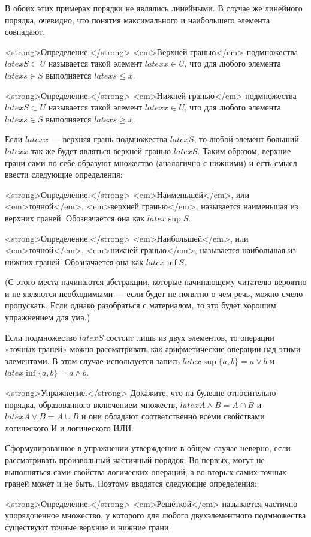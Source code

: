 В обоих этих примерах порядки не являлись линейными. В случае же линейного порядка, очевидно, что понятия максимального и наибольшего элемента совпадают.

<strong>Определение.</strong> <em>Верхней гранью</em> подмножества $latex S\subset U$ называется такой элемент $latex x\in U$, что для любого элемента $latex s\in S$ выполняется $latex s \le x$.

<strong>Определение.</strong> <em>Нижней гранью</em> подмножества $latex S\subset U$ называется такой элемент $latex x\in U$, что для любого элемента $latex s\in S$ выполняется $latex s \ge x$.

Если $latex x$ — верхняя грань подмножества $latex S$, то любой элемент больший $latex x$ так же будет являться верхней гранью $latex S$. Таким образом, верхние грани сами по себе образуют множество (аналогично с нижними) и есть смысл ввести следующие определения:

<strong>Определение.</strong> <em>Наименьшей</em>, или <em>точной</em>, <em>верхней гранью</em>, называется наименьшая из верхних граней. Обозначается она как $latex \sup S$.

<strong>Определение.</strong> <em>Наибольшей</em>, или <em>точной</em>, <em>нижней гранью</em>, называется наибольшая из нижних граней. Обозначается она как $latex \inf S$.

(С этого места начинаются абстракции, которые начинающему читателю вероятно и не являются необходимыми — если будет не понятно о чем речь, можно смело пропускать. Если однако разобраться с материалом, то это будет хорошим упражнением для ума.)

Если подмножество $latex S$ состоит лишь из двух элементов, то операции «точных граней» можно рассматривать как арифметические операции над этими элементами. В этом случае используется запись $latex \sup\{a, b\} = a\vee b$ и $latex \inf\{a, b\} = a\wedge b$.

<strong>Упражнение.</strong> Докажите, что на булеане относительно порядка, образованного включением множеств, $latex A\wedge B = A\cap B$ и $latex A\vee B = A \cup B$ и они обладают соответственно всеми свойствами логического И и логического ИЛИ.

Сформулированное в упражнении утверждение в общем случае неверно, если рассматривать произвольный частичный порядок. Во-первых, могут не выполняться сами свойства логических операций, а во-вторых самих точных граней может и не быть. Поэтому вводятся следующие определения:

<strong>Определение.</strong> <em>Решёткой</em> называется частично упорядоченное множество, у которого для любого двухэлементного подмножества существуют точные верхние и нижние грани.

